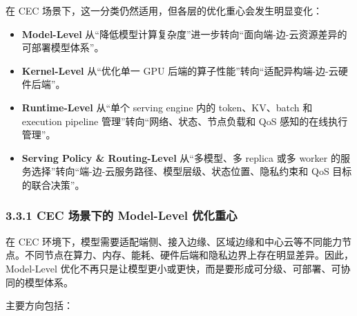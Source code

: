 \documentclass[a4paper,10pt]{ctexart}
\begin{document}
在 CEC 场景下，这一分类仍然适用，但各层的优化重心会发生明显变化：




\begin{itemize}
\item \textbf{Model-Level} 从“降低模型计算复杂度”进一步转向“面向端-边-云资源差异的可部署模型体系”。

\item \textbf{Kernel-Level} 从“优化单一 GPU 后端的算子性能”转向“适配异构端-边-云硬件后端”。

\item \textbf{Runtime-Level} 从“单个 serving engine 内的 token、KV、batch 和 execution pipeline 管理”转向“网络、状态、节点负载和 QoS 感知的在线执行管理”。

\item \textbf{Serving Policy \& Routing-Level} 从“多模型、多 replica 或多 worker 的服务选择”转向“端-边-云服务路径、模型层级、状态位置、隐私约束和 QoS 目标的联合决策”。



\end{itemize}




\subsubsection*{3.3.1 CEC 场景下的 Model-Level 优化重心}



在 CEC 环境下，模型需要适配端侧、接入边缘、区域边缘和中心云等不同能力节点。不同节点在算力、内存、能耗、硬件后端和隐私边界上存在明显差异。因此，Model-Level 优化不再只是让模型更小或更快，而是要形成可分级、可部署、可协同的模型体系。




主要方向包括：
\end{document}
